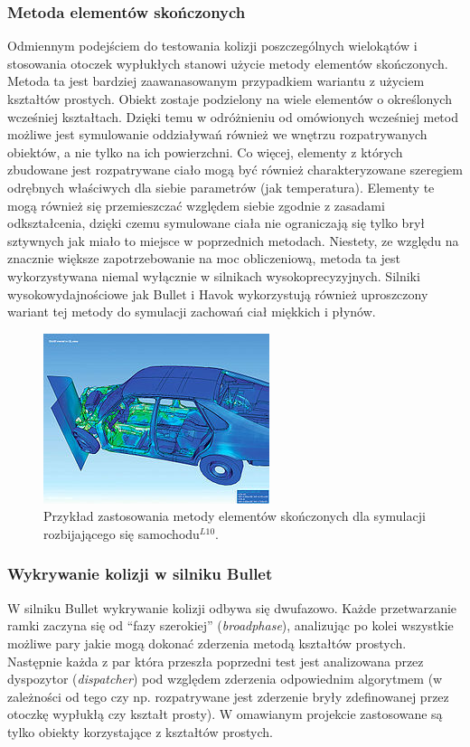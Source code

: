 \subsubsection{Metoda elementów skończonych}
Odmiennym podejściem do testowania kolizji poszczególnych wielokątów i
stosowania otoczek wypłukłych stanowi użycie metody elementów skończonych.
Metoda ta jest bardziej zaawanasowanym przypadkiem wariantu z użyciem kształtów
prostych. Obiekt zostaje podzielony na wiele elementów o określonych wcześniej
kształtach. Dzięki temu w odróżnieniu od omówionych wcześniej metod możliwe jest
symulowanie oddziaływań również we wnętrzu rozpatrywanych obiektów, a nie tylko
na ich powierzchni. Co więcej, elementy z których zbudowane jest rozpatrywane
ciało mogą być również charakteryzowane szeregiem odrębnych właściwych dla
siebie parametrów (jak temperatura). Elementy te mogą również się przemieszczać
względem siebie zgodnie z zasadami odkształcenia, dzięki czemu symulowane ciała
nie ograniczają się tylko brył sztywnych jak miało to miejsce w poprzednich
metodach. Niestety, ze względu na znacznie większe zapotrzebowanie na moc
obliczeniową, metoda ta jest wykorzystywana niemal wyłącznie w silnikach
wysokoprecyzyjnych. Silniki wysokowydajnościowe jak Bullet i Havok wykorzystują
również uproszczony wariant tej metody do symulacji zachowań ciał miękkich i płynów.

\begin{figure}[H]
\centering
\includegraphics[scale=1]{./img/finiteElementApplication.jpg}
\caption{Przykład zastosowania metody elementów skończonych dla symulacji
rozbijającego się samochodu$ ^{L10} $.}
\label{fig:finiteElementApplication}
\end{figure}

\subsubsection{Wykrywanie kolizji w silniku Bullet}
W silniku Bullet wykrywanie kolizji odbywa się dwufazowo. Każde przetwarzanie
ramki zaczyna się od ``fazy szerokiej'' (\emph{broadphase}), analizując po kolei
wszystkie możliwe pary jakie mogą dokonać zderzenia metodą kształtów prostych.
Następnie każda z par która przeszła poprzedni test jest analizowana przez
dyspozytor (\emph{dispatcher}) pod względem zderzenia odpowiednim algorytmem (w
zależności od tego czy np. rozpatrywane jest zderzenie bryły zdefinowanej przez
otoczkę wypłukłą czy kształt prosty). W omawianym projekcie zastosowane są
tylko obiekty korzystające z kształtów prostych.

